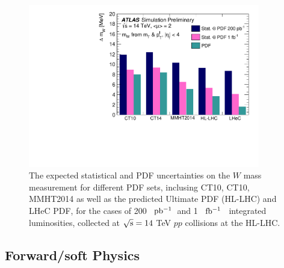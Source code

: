 \documentclass{article}
\newcommand*{\fbinv}{\ensuremath{{\rm fb^{-1}}}\xspace}
\newcommand*{\pbinv}{\ensuremath{{\rm pb^{-1}}}\xspace}
\begin{document}
\begin{figure}
\centering
\includegraphics[width=0.9\textwidth]{Wmass_fig_06.pdf}
\caption{\label{Fig:Wmass} The expected statistical and PDF uncertainties on the $W$ mass measurement for different PDF sets, inclusing CT10, CT10, MMHT2014 as well as the predicted Ultimate PDF (HL-LHC) and LHeC PDF,  for the cases of 200 ~\pbinv ~and 1 ~\fbinv~  integrated luminosities, collected at ${\rm \sqrt{s}=14}$ TeV $pp$ collisions at the HL-LHC.}
\end{figure}


\subsection{Forward/soft Physics}
\end{document}
